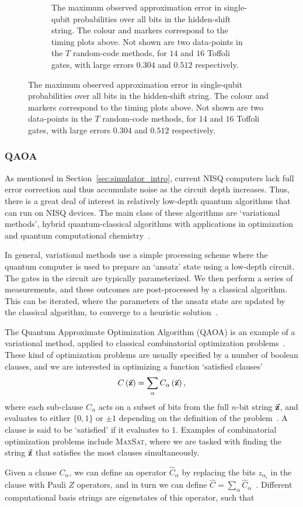 \begin{figure}[t]
\begin{subfigure}[t]{0.6\textwidth}
\caption{The maximum observed approximation error in single-qubit probabilities over all bits in the hidden-shift string. The colour and markers correspond to the timing plots above. Not shown are two data-points in the $T$ random-code methods, for $14$ and $16$ Toffoli gates, with large errors $0.304$ and $0.512$ respectively.}
\end{subfigure}
\end{figure}
\subsubsection*{QAOA}
As mentioned in Section~\ref{sec:simulator_intro}, current NISQ computers lack full error correction and thus accumulate noise as the circuit depth increases. Thus, there is a great deal of interest in relatively low-depth quantum algorithms that can run on NISQ devices. The main class of these algorithms are `variational methods', hybrid quantum-classical algorithms with applications in optimization and quantum computational chemistry~\cite{Moll2018}.\par
In general, variational methods use a simple processing scheme where the quantum computer is used to prepare an `ansatz' state using a low-depth circuit. The gates in the circuit are typically parameterized. We then perform a series of measurements, and these outcomes are post-processed by a classical algorithm. This can be iterated, where the parameters of the ansatz state are updated by the classical algorithm, to converge to a heuristic solution~\cite{Moll2018,Preskill2018}.\par
The Quantum Approximate Optimization Algorithm (QAOA) is an example of a variational method, applied to classical combinatorial optimization problems~\cite{Farhi2014}. These kind of optimization problems are usually specified by a number of boolean clauses, and we are interested in optimizing a function `satisfied clauses'
\[C\left(\va{z}\right) = \sum_{\alpha} C_{\alpha}\left(\va{z}\right),\]
where each sub-clause $C_{\alpha}$ acts on a subset of bits from the full $n$-bit string $\va{z}$, and evaluates to either $\{0,1\}$ or $\pm 1$ depending on the definition of the problem~\cite{Farhi2014}. A clause is said to be `satisfied' if it evaluates to $1$. Examples of combinatorial optimization problems include \textsc{MaxSat}, where we are tasked with finding the string $\va{z}$ that satisfies the most clauses simultaneously.\par
Given a clause $C_{\alpha}$, we can define an operator $\hat{C}_{\alpha}$ by replacing the bits $z_{\alpha_{i}}$ in the clause with Pauli $Z$ operators, and in turn we can define $\hat{C}=\sum_{\alpha}\hat{C}_{\alpha}$~\cite{Farhi2014}. Different computational basis strings are eigenstates of this operator, such that 
